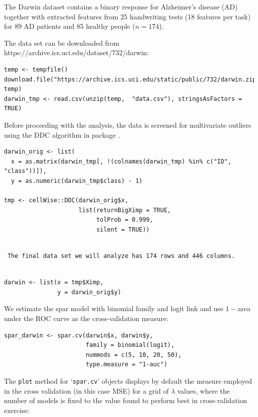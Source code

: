 \documentclass[
  article]{jss}
\begin{document}
The Darwin dataset \citep{CILIA2022darwin} contains a binary response
for Alzheimer's disease (AD) together with extracted features from 25
handwriting tests (18 features per task) for 89 AD patients and 85
healthy people (\(n=174\)).

The data set can be downloaded from
https://archive.ics.uci.edu/dataset/732/darwin:

\begin{verbatim}
temp <- tempfile()
download.file("https://archive.ics.uci.edu/static/public/732/darwin.zip", temp)
darwin_tmp <- read.csv(unzip(temp,  "data.csv"), stringsAsFactors = TRUE)
\end{verbatim}

Before proceeding with the analysis, the data is screened for
multivariate outliers using the DDC algorithm in package .

\begin{verbatim}
darwin_orig <- list(
  x = as.matrix(darwin_tmp[, !(colnames(darwin_tmp) %in% c("ID", "class"))]),
  y = as.numeric(darwin_tmp$class) - 1)

tmp <- cellWise::DDC(darwin_orig$x,
                     list(returnBigXimp = TRUE, 
                          tolProb = 0.999,
                          silent = TRUE))
\end{verbatim}

\begin{verbatim}
 
 The final data set we will analyze has 174 rows and 446 columns.
 
\end{verbatim}

\begin{verbatim}
darwin <- list(x = tmp$Ximp,
               y = darwin_orig$y)
\end{verbatim}

We estimate the spar model with binomial family and logit link and use
\(1-\)area under the ROC curve as the cross-validation measure:

\begin{verbatim}
spar_darwin <- spar.cv(darwin$x, darwin$y,
                       family = binomial(logit),
                       nummods = c(5, 10, 20, 50),
                       type.measure = "1-auc")
\end{verbatim}

The \texttt{plot} method for `\texttt{spar.cv}' objects displays by
default the measure employed in the cross validation (in this case MSE)
for a grid of \(\lambda\) values, where the number of models is fixed to
the value found to perform best in cross-validation exercise:
\end{document}
